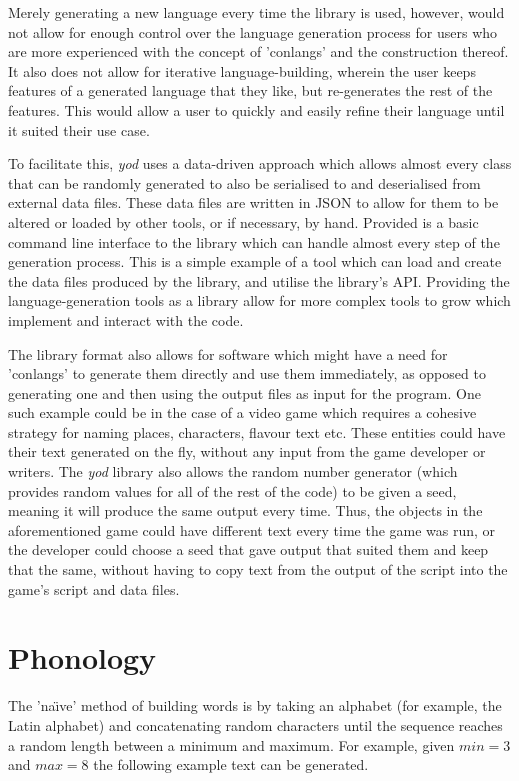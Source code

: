 \documentclass{report}
\begin{document}
   Merely generating a new language every time the library is used, however, would not allow for enough control over the language generation process for users who are more experienced with the concept of 'conlangs' and the construction thereof. It also does not allow for iterative language-building, wherein the user keeps features of a generated language that they like, but re-generates the rest of the features. This would allow a user to quickly and easily refine their language until it suited their use case.
   
   To facilitate this, \textit{yod} uses a data-driven approach which allows almost every class that can be randomly generated to also be serialised to and deserialised from external data files. These data files are written in JSON to allow for them to be altered or loaded by other tools, or if necessary, by hand. Provided is a basic command line interface to the library which can handle almost every step of the generation process. This is a simple example of a tool which can load and create the data files produced by the library, and utilise the library's API. Providing the language-generation tools as a library allow for more complex tools to grow which implement and interact with the code.
   
   The library format also allows for software which might have a need for 'conlangs' to generate them directly and use them immediately, as opposed to generating one and then using the output files as input for the program. One such example could be in the case of a video game which requires a cohesive strategy for naming places, characters, flavour text etc. These entities could have their text generated on the fly, without any input from the game developer or writers. The \textit{yod} library also allows the random number generator (which provides random values for all of the rest of the code) to be given a seed, meaning it will produce the same output every time. Thus, the objects in the aforementioned game could have different text every time the game was run, or the developer could choose a seed that gave output that suited them and keep that the same, without having to copy text from the output of the script into the game's script and data files.
   
   
   \chapter{Phonology}
   The 'na\"{\i}ve' method of building words is by taking an alphabet (for example, the Latin alphabet) and concatenating random characters until the sequence reaches a random length between a minimum and maximum. For example, given $min = 3$ and $max = 8$ the following example text can be generated.
   
\end{document}
